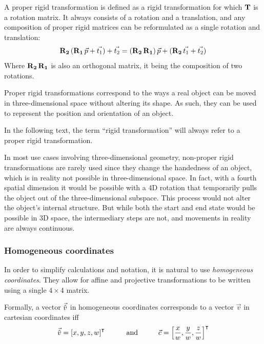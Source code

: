 A proper rigid transformation is defined as a rigid transformation for which $\mathbf{T}$ is a rotation matrix. It always consists of a rotation and a translation, and any composition of proper rigid matrices can be reformulated as a single rotation and translation:
\begin{equation}
	\mathbf{R_2} \, (\mathbf{R_1} \, \vec{p} + \vec{t_1}) + \vec{t_2} = (\mathbf{R_2} \, \mathbf{R_1}) \, \vec{p} + (\mathbf{R_2} \, \vec{t_1} + \vec{t_2})
\end{equation}
Where $\mathbf{R_2} \, \mathbf{R_1}$ is also an orthogonal matrix, it being the composition of two rotations.

Proper rigid transformations correspond to the ways a real object can be moved in three-dimensional space without altering its shape. As such, they can be used to represent the position and orientation of an object.

In the following text, the term ``rigid transformation'' will always refer to a proper rigid transformation.

In most use cases involving three-dimensional geometry, non-proper rigid transformations are rarely used since they change the handedness of an object, which is in reality not possible in three-dimensional space. In fact, with a fourth spatial dimension it would be possible with a 4D rotation that temporarily pulls the object out of the three-dimensional subspace. This process would not alter the object's internal structure. But while both the start and end state would be possible in 3D space, the intermediary steps are not, and movements in reality are always continuous.

\subsubsection{Homogeneous coordinates}
In order to simplify calculations and notation, it is natural to use \emph{homogeneous coordinates}. They allow for affine and projective transformations to be written using a single $4 \times 4$ matrix.

Formally, a vector $\vec{\hat{v}}$ in homogeneous coordinates corresponds to a vector $\vec{v}$ in cartesian coordinates iff
\begin{equation}
	\vec{\hat{v}} = \left[x, y, z, w\right]^\intercal
	\hspace{1cm}\mathrm{and}\hspace{1cm}
	\vec{c} = \left[\frac{x}{w}, \frac{y}{w}, \frac{z}{w}\right]^\intercal
\end{equation}

